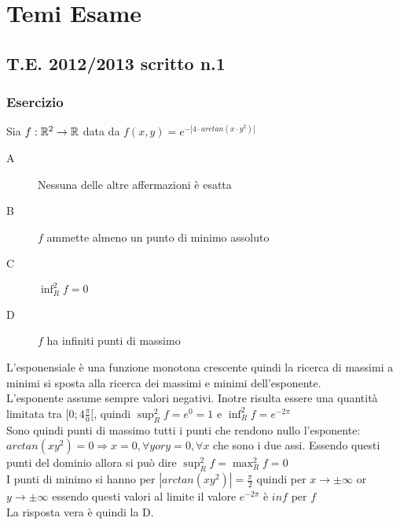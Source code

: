 \part{Temi Esame}

\chapter{T.E. 2012/2013 scritto n.1}
\section{Esercizio}
Sia $f: \mathbb{R}^2 \rightarrow \mathbb{R}$ data da $f(x, y)=e^{-|4\cdot arctan(x\cdot y^2)|}$
\begin{description}
	\item[A] Nessuna delle altre affermazioni è esatta
	\item[B] $f$ ammette almeno un punto di minimo assoluto
	\item[C] $\inf_R^2f = 0$
	\item[D] $f$ ha infiniti punti di massimo
\end{description}
L'esponensiale è una funzione monotona crescente quindi la ricerca di massimi a minimi si sposta alla ricerca dei massimi e minimi dell'esponente.\\
L'esponente assume sempre valori negativi. Inotre risulta essere una quantità limitata tra $[0;4\frac{\pi}{0}[$, quindi $\sup_R^2f=e^0=1$ e $\inf_R^2f=e^{-2\pi}$\\
Sono quindi punti di massimo tutti i punti che rendono nullo l'esponente: $arctan(xy^2)=0\Rightarrow x=0,\forall y or y=0,\forall x$ che sono i due assi. Essendo questi punti del dominio allora si può dire $\sup_R^2f=\max_R^2f=0$\\
I punti di minimo si hanno per $|arctan(xy^2)|=\frac{\pi}{2}$ quindi per $x\rightarrow \pm\infty$ or $y\rightarrow \pm\infty$ essendo questi valori al limite il valore $e^{-2\pi}$ è $inf$ per $f$\\
La risposta vera è quindi la D.\\
